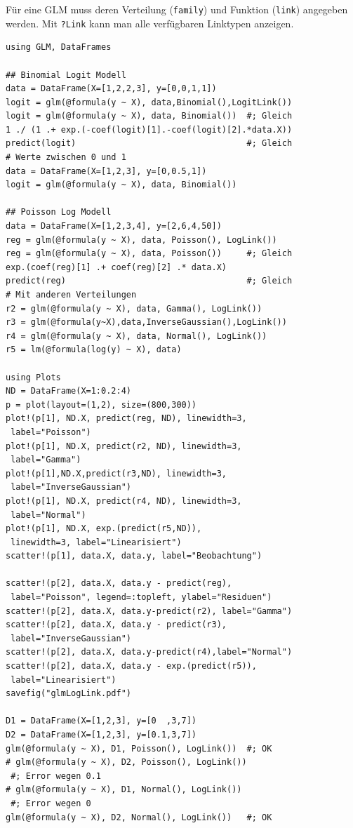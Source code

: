 \documentclass[10pt,twocolumn]{scrartcl}
\begin{document}
Für eine GLM muss deren Verteilung (\lstinline|family|) und Funktion
(\lstinline|link|) angegeben werden. Mit \lstinline|?Link| kann man alle
verfügbaren Linktypen anzeigen.

\begin{lstlisting}
using GLM, DataFrames

## Binomial Logit Modell
data = DataFrame(X=[1,2,2,3], y=[0,0,1,1])
logit = glm(@formula(y ~ X), data,Binomial(),LogitLink())
logit = glm(@formula(y ~ X), data, Binomial())  #; Gleich
1 ./ (1 .+ exp.(-coef(logit)[1].-coef(logit)[2].*data.X))
predict(logit)                                  #; Gleich
# Werte zwischen 0 und 1
data = DataFrame(X=[1,2,3], y=[0,0.5,1])
logit = glm(@formula(y ~ X), data, Binomial())

## Poisson Log Modell
data = DataFrame(X=[1,2,3,4], y=[2,6,4,50])
reg = glm(@formula(y ~ X), data, Poisson(), LogLink())
reg = glm(@formula(y ~ X), data, Poisson())     #; Gleich
exp.(coef(reg)[1] .+ coef(reg)[2] .* data.X)
predict(reg)                                    #; Gleich
# Mit anderen Verteilungen
r2 = glm(@formula(y ~ X), data, Gamma(), LogLink())
r3 = glm(@formula(y~X),data,InverseGaussian(),LogLink())
r4 = glm(@formula(y ~ X), data, Normal(), LogLink())
r5 = lm(@formula(log(y) ~ X), data)

using Plots
ND = DataFrame(X=1:0.2:4)
p = plot(layout=(1,2), size=(800,300))
plot!(p[1], ND.X, predict(reg, ND), linewidth=3,
 label="Poisson")
plot!(p[1], ND.X, predict(r2, ND), linewidth=3,
 label="Gamma")
plot!(p[1],ND.X,predict(r3,ND), linewidth=3,
 label="InverseGaussian")
plot!(p[1], ND.X, predict(r4, ND), linewidth=3,
 label="Normal")
plot!(p[1], ND.X, exp.(predict(r5,ND)),
 linewidth=3, label="Linearisiert")
scatter!(p[1], data.X, data.y, label="Beobachtung")

scatter!(p[2], data.X, data.y - predict(reg),
 label="Poisson", legend=:topleft, ylabel="Residuen")
scatter!(p[2], data.X, data.y-predict(r2), label="Gamma")
scatter!(p[2], data.X, data.y - predict(r3),
 label="InverseGaussian")
scatter!(p[2], data.X, data.y-predict(r4),label="Normal")
scatter!(p[2], data.X, data.y - exp.(predict(r5)),
 label="Linearisiert")
savefig("glmLogLink.pdf")

D1 = DataFrame(X=[1,2,3], y=[0  ,3,7])
D2 = DataFrame(X=[1,2,3], y=[0.1,3,7])
glm(@formula(y ~ X), D1, Poisson(), LogLink())  #; OK
# glm(@formula(y ~ X), D2, Poisson(), LogLink())
 #; Error wegen 0.1
# glm(@formula(y ~ X), D1, Normal(), LogLink())
 #; Error wegen 0
glm(@formula(y ~ X), D2, Normal(), LogLink())   #; OK
\end{lstlisting}
\end{document}
